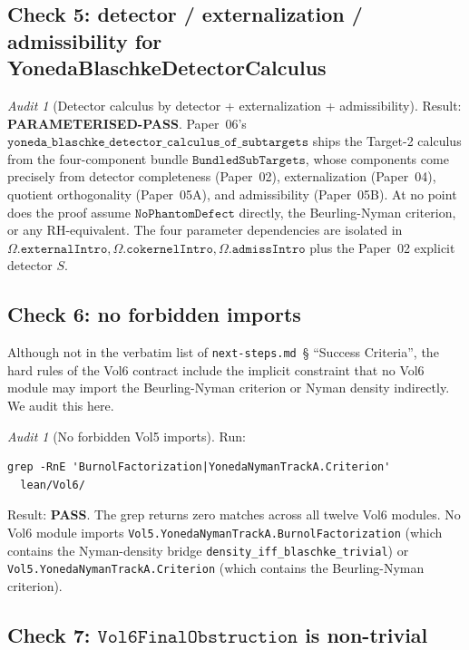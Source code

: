 \documentclass[11pt]{article}
\theoremstyle{plain}
\theoremstyle{definition}
\theoremstyle{remark}
\newtheorem{audit}[theorem]{Audit}
\newcommand{\code}[1]{\texttt{#1}}
\newcommand{\Obs}{\Omega}
\begin{document}
\subsection{Check 5: detector / externalization / admissibility for YonedaBlaschkeDetectorCalculus}
\label{sec:check-5}

\begin{audit}[Detector calculus by detector + externalization +
admissibility]
\label{audit:detector-calculus}
Result: \textbf{PARAMETERISED-PASS}.
Paper~06's
\(\code{yoneda\_blaschke\_detector\_calculus\_of\_subtargets}\) ships
the Target-2 calculus from the four-component bundle
\(\code{BundledSubTargets}\), whose components come precisely from
detector completeness (Paper~02), externalization (Paper~04),
quotient orthogonality (Paper~05A), and admissibility (Paper~05B). At
no point does the proof assume \(\code{NoPhantomDefect}\)
directly, the Beurling-Nyman criterion, or any RH-equivalent.
The four parameter dependencies are isolated in
\(\Obs.\code{externalIntro},\Obs.\code{cokernelIntro},\Obs.\code{admissIntro}\)
plus the Paper~02 explicit detector \(S\).
\end{audit}

\subsection{Check 6: no forbidden imports}
\label{sec:check-6}

Although not in the verbatim list of \code{next-steps.md}~\S
``Success Criteria'', the hard rules of the Vol6 contract include the
implicit constraint that no Vol6 module may import the
Beurling-Nyman criterion or Nyman density indirectly.  We audit
this here.

\begin{audit}[No forbidden Vol5 imports]
\label{audit:forbidden-imports}
Run:
\begin{lstlisting}
grep -RnE 'BurnolFactorization|YonedaNymanTrackA.Criterion'
  lean/Vol6/
\end{lstlisting}
Result: \textbf{PASS}.  The grep returns zero matches across all
twelve Vol6 modules.  No Vol6 module imports
\code{Vol5.YonedaNymanTrackA.BurnolFactorization} (which contains
the Nyman-density bridge \code{density\_iff\_blaschke\_trivial}) or
\code{Vol5.YonedaNymanTrackA.Criterion} (which contains the
Beurling-Nyman criterion).
\end{audit}

\subsection{Check 7: \(\code{Vol6FinalObstruction}\) is non-trivial}
\label{sec:check-7}
\end{document}
